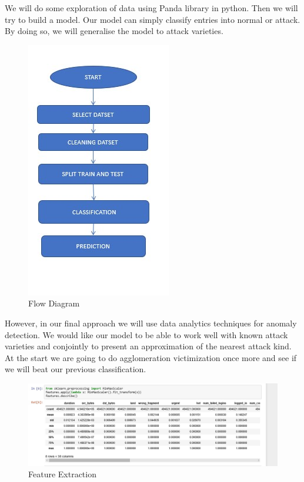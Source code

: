 We will do some exploration of data using Panda library in python. Then we will try to build a model. Our model can simply classify entries into normal or attack. By doing so, we will generalise the model to attack varieties. \newline
\begin{figure}
    \centering
    \includegraphics{texfiles/images/flow_diagram.jpg}
    \caption{Flow Diagram}
    \label{fig:flow_diagram}
\end{figure}
However, in our final approach we will use data analytics techniques for anomaly detection. We would like our model to be able to work well with known attack varieties and conjointly to present an approximation of the nearest attack kind. At the start we are going to do agglomeration victimization once more and see if we will beat our previous classification.\newline

\begin{figure}
    \centering
    \includegraphics{texfiles/images/feature_extraction_in_code1.jpg}
    \caption{Feature Extraction}
    \label{fig:Feature Extraction}
\end{figure}

